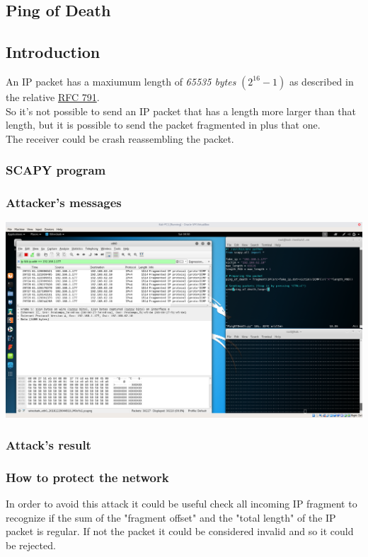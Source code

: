 \subsection{Ping of Death}
\subsection{Introduction}
An IP packet has a maxiumum length of \textit{65535 bytes} $(2^{16}-1)$ as described in the relative \href{https://tools.ietf.org/html/rfc791}{RFC 791}.\\
So it's not possible to send an IP packet that has a length more larger than that length, but it is possible to send the packet fragmented in plus that one.\\
The receiver could be crash reassembling the packet.\par

\subsubsection{SCAPY program}


\subsubsection{Attacker's messages}
\includegraphics[width=16cm]{img/PingOfDeath.png}

\subsubsection{Attack's result}


\subsubsection{How to protect the network}
In order to avoid this attack it could be useful check all incoming IP fragment to recognize if the sum of the "fragment offset" and the "total length" of the IP packet is regular. If not the packet it could be considered invalid and so it could be rejected.\par
